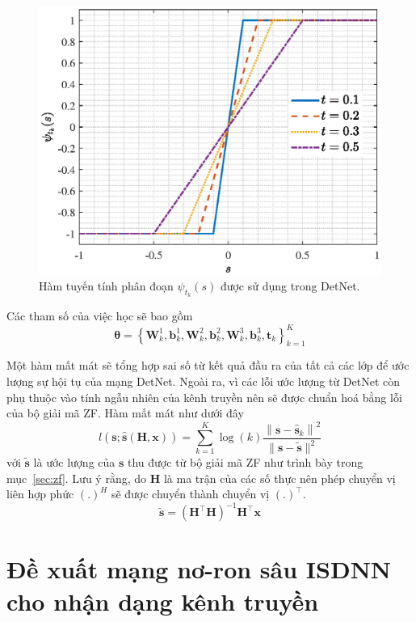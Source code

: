 \begin{figure}[H]
    \centering
    \includegraphics[width=.6\linewidth]{figures/soft_sign.eps}
    \caption{Hàm tuyến tính phân đoạn $\psi_{t_k}(s)$ được sử dụng trong DetNet.}
    \label{fig:soft_sign}
\end{figure}
Các tham số của việc học sẽ bao gồm 
\begin{equation}
\boldsymbol{\theta}=\left\{\mathbf{W}^1_{k}, \mathbf{b}^1_{k}, \mathbf{W}^2_{k}, \mathbf{b}^2_{k}, \mathbf{W}^3_{k}, \mathbf{b}^3_{ k}, \mathbf{t}_k\right\}_{k=1}^K
\end{equation}

Một hàm mất mát sẽ tổng hợp sai số từ kết quả đầu ra của tất cả các lớp để ước lượng sự hội tụ của mạng DetNet. Ngoài ra, vì các lỗi ước lượng từ DetNet còn phụ thuộc vào tính ngẫu nhiên của kênh truyền nên sẽ được chuẩn hoá bằng lỗi của bộ giải mã ZF. Hàm mất mát như dưới đây
\begin{equation}
\label{eq:lossdetnet}
    l(\mathbf{s} ; \hat{\mathbf{s}}(\mathbf{H}, \mathbf{x}))=\sum_{k=1}^K \log (k) \frac{\left\|\mathbf{s}-\hat{\mathbf{s}}_k\right\|^2}{\|\mathbf{s}-\tilde{\mathbf{s}}\|^2}
\end{equation}
với $\tilde{\mathbf{s}}$ là ước lượng của $\mathbf{s}$ thu được từ bộ giải mã ZF như trình bày trong mục~\ref{sec:zf}. Lưu ý rằng, do $\mathbf{H}$ là ma trận của các số thực nên phép chuyển vị liên hợp phức $(.)^H$ sẽ được chuyển thành chuyển vị $(.)^\top$.
\begin{equation}
    \tilde{\mathbf{s}}=\left(\mathbf{H}^\top \mathbf{H}\right)^{-1} \mathbf{H}^\top \mathbf{x}
\end{equation}

\section{Đề xuất mạng nơ-ron sâu ISDNN cho nhận dạng kênh truyền}

